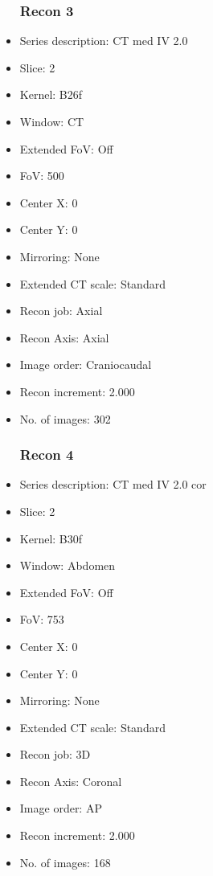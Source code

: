 \documentclass[12pt]{article}
\begin{document}
\begin{itemize}
\subsubsection{Recon 3}
\item Series description: CT med IV 2.0
\item Slice: 2
\item Kernel: B26f
\item Window: CT
\item Extended FoV: Off
\item FoV: 500
\item Center X: 0
\item Center Y: 0
\item Mirroring: None
\item Extended CT scale: Standard
\item Recon job: Axial
\item Recon Axis: Axial
\item Image order: Craniocaudal
\item Recon increment: 2.000
\item No. of images: 302
\subsubsection{Recon 4}
\item Series description: CT med IV 2.0 cor
\item Slice: 2
\item Kernel: B30f
\item Window: Abdomen
\item Extended FoV: Off
\item FoV: 753
\item Center X: 0
\item Center Y: 0
\item Mirroring: None
\item Extended CT scale: Standard
\item Recon job: 3D
\item Recon Axis: Coronal
\item Image order: AP
\item Recon increment: 2.000
\item No. of images: 168

\end{itemize}
\end{document}
